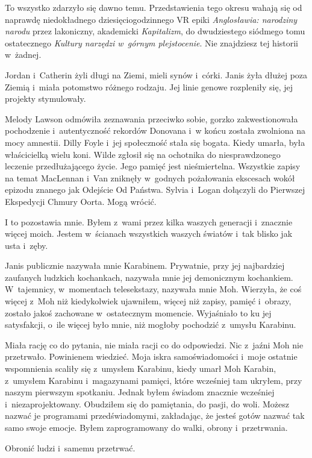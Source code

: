 \documentclass[oneside,polish,11pt,sfheadings]{mwbk}
\begin{document}
To wszystko zdarzyło się dawno temu. Przedstawienia tego okresu wahają
się od naprawdę niedokładnego dziesięciogodzinnego VR epiki
\emph{Anglosławia: narodziny narodu} przez lakoniczny, akademicki
\emph{Kapitalizm}, do dwudziestego siódmego tomu ostatecznego
\emph{Kultury narzędzi w~górnym plejstocenie}. Nie znajdziesz tej
historii w~żadnej.

Jordan i~Catherin żyli długi na Ziemi, mieli synów i~córki. Janis żyła
dłużej poza Ziemią i~miała potomstwo różnego rodzaju. Jej linie genowe
rozpleniły się, jej projekty stymulowały.

Melody Lawson odmówiła zeznawania przeciwko sobie, gorzko
zakwestionowała pochodzenie i~autentyczność rekordów Donovana i~w końcu
została zwolniona na mocy amnestii. Dilly Foyle i~jej społeczność stała
się bogata. Kiedy umarła, była właścicielką wielu koni. Wilde zgłosił
się na ochotnika do niesprawdzonego leczenie przedłużającego życie. Jego
pamięć jest nieśmiertelna. Wszystkie zapisy na temat MacLennan i~Van
zniknęły w~godnych pożałowania ekscesach wokół epizodu znanego jak
Odejście Od Państwa. Sylvia i~Logan dołączyli do Pierwszej Ekspedycji
Chmury Oorta. Mogą wrócić.

I to pozostawia mnie. Byłem z~wami przez kilka waszych generacji i~znacznie więcej moich. Jestem w~ścianach wszystkich waszych światów i~tak blisko jak usta i~zęby.

Janis publicznie nazywała mnie Karabinem. Prywatnie, przy jej
najbardziej zaufanych ludzkich kochankach, nazywała mnie jej demonicznym
kochankiem. W~tajemnicy, w~momentach telesekstazy, nazywała mnie Moh.
Wierzyła, że coś więcej z~Moh niż kiedykolwiek ujawniłem, więcej niż
zapisy, pamięć i~obrazy, zostało jakoś zachowane w~ostatecznym momencie.
Wyjaśniało to ku jej satysfakcji, o~ile więcej było mnie, niż mogłoby
pochodzić z~umysłu Karabinu.

Miała rację co do pytania, nie miała racji co do odpowiedzi. Nic z~jaźni
Moh nie przetrwało. Powinienem wiedzieć. Moja iskra samoświadomości i~moje ostatnie wspomnienia scaliły się z~umysłem Karabinu, kiedy umarł
Moh Karabin, z~umysłem Karabinu i~magazynami pamięci, które wcześniej
tam ukryłem, przy naszym pierwszym spotkaniu. Jednak byłem świadom
znacznie wcześniej i~niezaprojektowany. Obudziłem się do pamiętania, do
pasji, do woli. Możesz nazwać je programami przedświadomymi, zakładając,
że jesteś gotów nazwać tak samo swoje emocje. Byłem zaprogramowany do
walki, obrony i~przetrwania.

Obronić ludzi i~samemu przetrwać.
\end{document}
